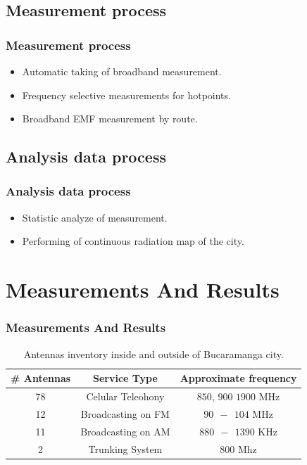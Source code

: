 \documentclass[xcolor=svgnames]{beamer}
\begin{document}
\subsection{Measurement process}
\begin{frame}
\frametitle{Measurement process}
 \begin{itemize}
  \item Automatic taking of broadband measurement.\pause
  \item Frequency selective measurements for hotpoints.\pause
  \item Broadband EMF measurement by route.
 \end{itemize}
\end{frame}

\subsection{Analysis data process}
\begin{frame}
\frametitle{Analysis data process}
 \begin{itemize}
  \item Statistic analyze of measurement.\pause
  \item Performing of continuous radiation map of the city.
 \end{itemize}
\end{frame}

\section{Measurements And Results}
\begin{frame}
 \frametitle{Measurements And Results}
 \begin{table}[H]
	\centering
\begin{tabular}{|c|c|c|}\hline
\textbf{\# Antennas} & \textbf{Service Type} & \textbf{Approximate frequency} \\ \hline
78 & Celular Teleohony & $850$, $900$ $1900$ MHz \\ \hline
12 & Broadcasting on FM & $90\ \ -\ \ 104$ MHz \\ \hline
11 & Broadcasting on AM & $880\ \ -\ \ 1390$ KHz \\ \hline
2 & Trunking System & $800$ Mhz \\ \hline
    \end{tabular}
	\caption{Antennas inventory inside and outside of Bucaramanga city.}
	\label{tab1}
\end{table}
\end{frame}
\end{document}
